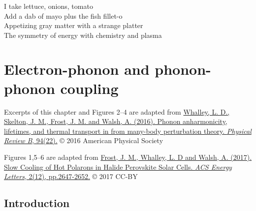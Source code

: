 \begin{savequote}[8cm]
I take lettuce, onions, tomato \\
Add a dab of mayo plus the fish fillet-o \\
Appetizing gray matter with a strange platter \\
The symmetry of energy with chemistry and plasma \\
\end{savequote}


\chapter{\label{ch:5-epcoupling}Electron-phonon and phonon-phonon coupling}

Excerpts of this chapter and Figures 2--4 are adapted from
\href{https://doi.org/10.1103/PhysRevB.94.220301}{Whalley, L. D., Skelton, J. M., Frost, J. M. and Walsh, A. (2016). Phonon anharmonicity, lifetimes, and thermal transport in  from many-body perturbation theory. \textit{Physical Review B}, 94(22).} © 2016 American Physical Society

Figures 1,5--6 are adapted from
\href{https://doi.org/10.1021/acsenergylett.7b00862}{Frost, J. M., Whalley, L. D and Walsh, A. (2017). Slow Cooling of Hot Polarons in Halide Perovskite Solar Cells. \textit{ACS Energy Letters}, 2(12), pp.2647-2652.} © 2017 CC-BY

\section{Introduction} \label{ch5:introduction}

